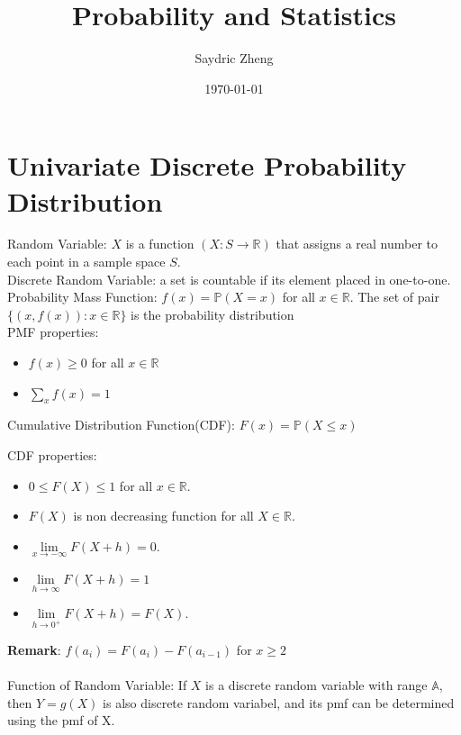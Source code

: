 \documentclass{article}
\newcommand{\R}{\mathbb{R}}
\renewcommand{\P}{\mathbb{P}}
\begin{document}
\title{Probability and Statistics}
\author{Saydric Zheng}
\date{\today}
\maketitle

\tableofcontents
\newpage
\markboth{}{}


\section{Univariate Discrete Probability Distribution}


\noindent Random Variable: $X$ is a function $(X: S \rightarrow \R)$ that assigns a real number to each point in a sample space $S$.\\

\noindent Discrete Random Variable: a set is countable if its element placed in one-to-one.\\

\noindent Probability Mass Function: $f(x) = \P(X=x)$ for all $x \in \R$. The set of pair $\{(x, f(x)): x \in \R\}$
is the probability distribution \\

\noindent PMF properties:
\begin{itemize}
    \item[(1)] $f(x) \ge 0$ for all $x \in \R$
    \item[(2)] $\sum_x f(x) = 1 $
\end{itemize}

\noindent Cumulative Distribution Function(CDF): $F(x) = \P(X \le x)$

\noindent CDF properties:
\begin{itemize}
    \item[(1)] $0 \le F(X) \le 1$ for all $x \in \R$.
    \item[(2)] $F(X)$ is non decreasing function for all $X \in \R$. 
    \item[(3)] $\lim\limits_{x \to -\infty} F(X+h) = 0$.
    \item[(4)] $\lim\limits_{h \to \infty}F(X+h) = 1$
    \item[(5)] $\lim\limits_{h \to 0^{+}}F(X+h) = F(X)$.
\end{itemize} 

\noindent \textbf{Remark}: $f(a_i) = F(a_i) - F(a_{i-1})$ for $x \ge 2$ \\\\
\noindent Function of Random Variable: If $X$ is a discrete random variable with range $\mathbb{A}$, then $Y = g(X)$ is also discrete random variabel, and its pmf can be determined using the pmf of X.
\end{document}

